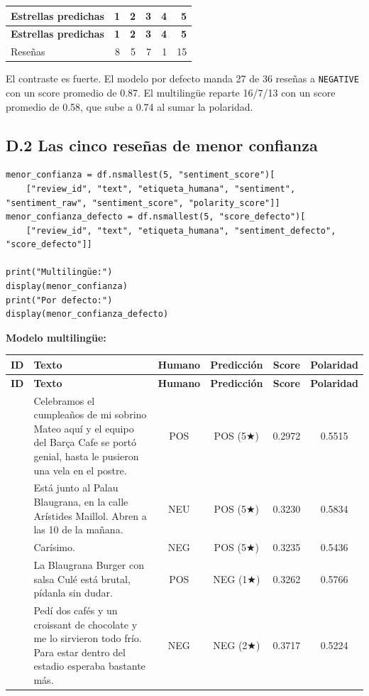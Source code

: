 \documentclass[12pt,a4paper]{article}
\begin{document}
{\small\renewcommand{\arraystretch}{1.3}
\begin{longtable}{|l|r|r|r|r|r|}
\hline
\textbf{Estrellas predichas} & \textbf{1} & \textbf{2} & \textbf{3} & \textbf{4} & \textbf{5} \\ \hline
\endfirsthead
\hline
\textbf{Estrellas predichas} & \textbf{1} & \textbf{2} & \textbf{3} & \textbf{4} & \textbf{5} \\ \hline
\endhead
Reseñas & 8 & 5 & 7 & 1 & 15 \\ \hline
\end{longtable}}


El contraste es fuerte. El modelo por defecto manda 27 de 36 reseñas a \texttt{NEGATIVE} con un
score promedio de 0.87. El multilingüe reparte 16/7/13 con un score promedio de 0.58, que sube a
0.74 al sumar la polaridad.


\subsection{D.2 Las cinco reseñas de menor confianza}

\begin{lstlisting}[style=codigo]
menor_confianza = df.nsmallest(5, "sentiment_score")[
    ["review_id", "text", "etiqueta_humana", "sentiment", "sentiment_raw", "sentiment_score", "polarity_score"]]
menor_confianza_defecto = df.nsmallest(5, "score_defecto")[
    ["review_id", "text", "etiqueta_humana", "sentiment_defecto", "score_defecto"]]

print("Multilingüe:")
display(menor_confianza)
print("Por defecto:")
display(menor_confianza_defecto)
\end{lstlisting}

\textbf{Modelo multilingüe:}

{\footnotesize\renewcommand{\arraystretch}{1.3}
\begin{longtable}{|>{\raggedright\arraybackslash}p{0.8cm}|>{\raggedright\arraybackslash}p{6.4cm}|c|c|c|c|}
\hline
\textbf{ID} & \textbf{Texto} & \textbf{Humano} & \textbf{Predicción} & \textbf{Score} & \textbf{Polaridad} \\ \hline
\endfirsthead
\hline
\textbf{ID} & \textbf{Texto} & \textbf{Humano} & \textbf{Predicción} & \textbf{Score} & \textbf{Polaridad} \\ \hline
\endhead
24 & Celebramos el cumpleaños de mi sobrino Mateo aquí y el equipo del Barça Cafe se portó genial, hasta le pusieron una vela en el postre. & POS & POS (5★) & 0.2972 & 0.5515 \\ \hline
17 & Está junto al Palau Blaugrana, en la calle Arístides Maillol. Abren a las 10 de la mañana. & NEU & POS (5★) & 0.3230 & 0.5834 \\ \hline
13 & Carísimo. & NEG & POS (5★) & 0.3235 & 0.5436 \\ \hline
29 & La Blaugrana Burger con salsa Culé está brutal, pídanla sin dudar. & POS & NEG (1★) & 0.3262 & 0.5766 \\ \hline
3 & Pedí dos cafés y un croissant de chocolate y me lo sirvieron todo frío. Para estar dentro del estadio esperaba bastante más. & NEG & NEG (2★) & 0.3717 & 0.5224 \\ \hline
\end{longtable}}
\end{document}

